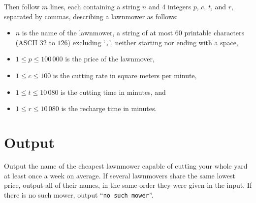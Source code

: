 Then follow $m$ lines, each containing a string $n$ and $4$ integers
$p$, $c$, $t$, and $r$, separated by commas, describing a lawnmower as
follows:
\begin{itemize}
\setlength{\itemsep}{0pt}
\item $n$ is the name of the lawnmower, a string of at most $60$ printable characters (ASCII $32$ to $126$) excluding `\texttt{,}', neither starting nor ending with a space,

\item $1 \leq p \leq 100\,000$ is the price of the lawnmover,

\item $1 \leq c \leq 100$ is the cutting rate in square meters per minute,

\item $1 \leq t \leq 10\,080$ is the cutting time in minutes, and

\item $1 \leq r \leq 10\,080$ is the recharge time in minutes.
\end{itemize}

\section*{Output}

Output the name of the cheapest lawnmower capable of cutting your
whole yard at least once a week on average. If several lawnmovers
share the same lowest price, output all of their names, in the same
order they were given in the input. If there is no such mower, output
``\texttt{no such mower}''.
